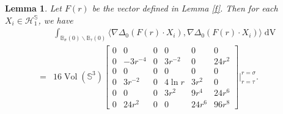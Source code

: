 \documentclass[11pt,letterpaper]{amsart}
\DeclareMathOperator{\Vol}{Vol}
\DeclareMathOperator{\dvol}{dV}
\newcommand{\bB}{\mathbb{B}}
\newcommand{\bS}{\mathbb{S}}
\newtheorem{lemma}[theorem]{Lemma}
\theoremstyle{definition}
\theoremstyle{remark}
\numberwithin{equation}{section}
\begin{document}
\begin{lemma}\label{energy-f}
    Let $F(r)$ be the vector defined in Lemma \ref{f}. Then for each $X_i\in \mathcal{H}^{\bS}_{1}$, we have
\begin{equation}
\begin{split}
    &\int_{\bB_{\sigma}(0)\backslash \bB_{\tau}(0)}\langle \nabla \Delta_0 (F(r)\cdot X_i), \nabla \Delta_0(F(r)\cdot X_i)\rangle \dvol\\
    =&16 \Vol(\bS^3) \begin{bmatrix}
0 & 0 & 0 & 0 & 0& 0\\
0 & -3r^{-4} & 0 & 3r^{-2} & 0& 24r^2\\
0 & 0 & 0& 0& 0 & 0\\
0 & 3r^{-2} & 0 & {4\ln r} & 3r^2& 0\\
0 & 0 & 0 & 3r^2 & 9r^4& 24r^6\\
0 & 24r^2 & 0 & 0 & 24r^6& 96r^8
\end{bmatrix}\Bigg|_{r=\tau}^{r=\sigma}.
\end{split}
\end{equation}
    
\end{lemma}
\end{document}
